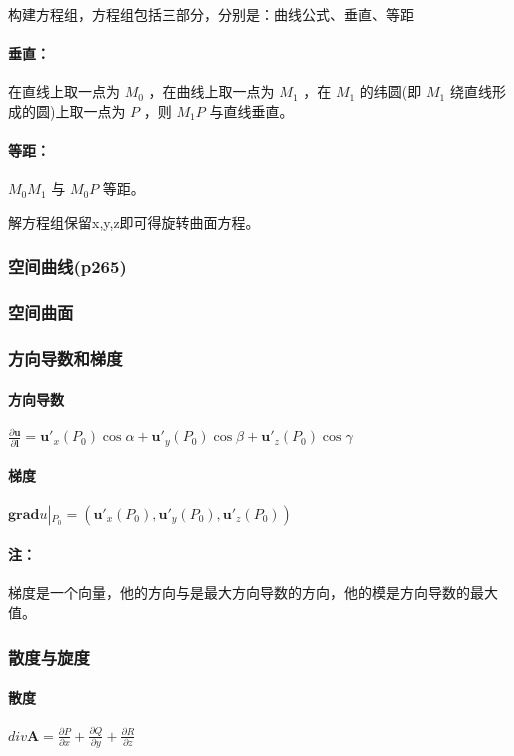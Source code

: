 ﻿\documentclass[a4paper,12pt,UTF8]{ctexart}
\begin{document}
    构建方程组，方程组包括三部分，分别是：曲线公式、垂直、等距

    \paragraph{垂直：} 在直线上取一点为 \(M_0\) ，在曲线上取一点为 \(M_1\) ，在 \(M_1\) 的纬圆(即 \(M_1\) 绕直线形成的圆)上取一点为 \(P\) ，则 \(M_1P\) 与直线垂直。
    \paragraph{等距：} \(M_0M_1\) 与 \(M_0P\) 等距。

    解方程组保留x,y,z即可得旋转曲面方程。
    
    \subsubsection{空间曲线(p265)}
    
    \subsubsection{空间曲面}
    
    \subsubsection{方向导数和梯度}
    \paragraph{方向导数} \(\frac{\partial \mathbf{u}}{\partial \mathbf{l}}= \mathbf{u}'_x(P_0)\cos \alpha + \mathbf{u}'_y(P_0)\cos \beta + \mathbf{u}'_z(P_0)\cos \gamma\)
    \paragraph{梯度} \(\mathbf{grad} u \left|_{P_0}\right. = \left(\mathbf{u}'_x(P_0), \mathbf{u}'_y(P_0), \mathbf{u}'_z(P_0)\right)\)
    \paragraph{注：} 梯度是一个向量，他的方向与是最大方向导数的方向，他的模是方向导数的最大值。
        
    \subsubsection{散度与旋度}
    \paragraph{散度} \(div \mathbf{A} = \frac{\partial P}{\partial x} + \frac{\partial Q}{\partial y} + \frac{\partial R}{\partial z}\)
\end{document}
